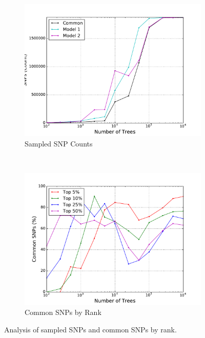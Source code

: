 \begin{figure}[H]
  \centering
  \begin{subfigure}[b]{0.45\textwidth}
    \includegraphics[width=\textwidth]{figures/random_forests/snp_counts}
    \caption{Sampled SNP Counts}
    \label{fig:ranking-counts}
  \end{subfigure}
  ~
  \begin{subfigure}[b]{0.45\textwidth}
    \includegraphics[width=\textwidth]{figures/random_forests/common_snps}
    \caption{Common SNPs by Rank}
    \label{fig:ranking-common}
  \end{subfigure}
  \caption{Analysis of sampled SNPs and common SNPs by rank.}
  \label{fig:ranking}
\end{figure}


